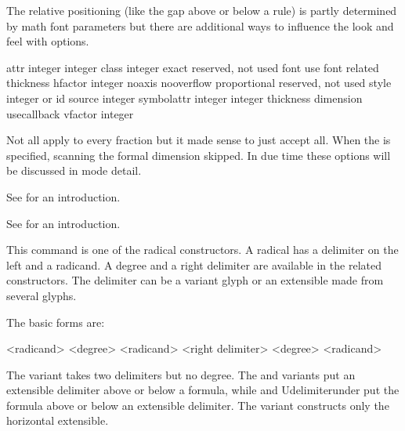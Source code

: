 The relative positioning (like the gap above or below a rule) is partly
determined by math font parameters but there are additional ways to influence the
look and feel with options.

\starttabulate[|Tl|l|l|]
\NC attr         \NC integer integer \NC \NC \NR
\NC class        \NC integer         \NC \NC \NR
\NC exact        \NC                 \NC reserved, not used \NC \NR
\NC font         \NC                 \NC use font related thickness \NC \NR
\NC hfactor      \NC integer         \NC \NC \NR
\NC noaxis       \NC                 \NC \NC \NR
\NC nooverflow   \NC                 \NC \NC \NR
\NC proportional \NC                 \NC reserved, not used \NC \NR
\NC style        \NC integer or id   \NC \NC \NR
\NC source       \NC integer         \NC \NC \NR
\NC symbolattr   \NC integer integer \NC \NC \NR
\NC thickness    \NC dimension       \NC \NC \NR
\NC usecallback  \NC                 \NC \NC \NR
\NC vfactor      \NC integer         \NC \NC \NR
\stoptabulate

Not all apply to every fraction but it made sense to just accept all. When the
 is specified, scanning the formal dimension skipped. In due
time these options will be discussed in mode detail.

\stopnewprimitive

\startnewprimitive[title={\prm {Uoverdelimiter}}]

See  for an introduction.

\stopnewprimitive

\startnewprimitive[title={\prm {Uoverwithdelims}}]

See  for an introduction.

\stopnewprimitive

\startnewprimitive[title={\prm {Uradical}}]

This command is one of the radical constructors. A radical has a delimiter on
the left and a radicand. A degree and a right delimiter are available in the
related constructors. The delimiter can be a variant glyph or an extensible
made from several glyphs.

The basic forms are:

\starttabulate[|l|l|]
    \NC \type {\Uradical}  {<radicand>} \NC \NR
    \NC \type {\Uroot}     {<degree>} {<radicand>} \NC \NR
    \NC \type {\Urooted}   <right delimiter> {<degree>} {<radicand>} \NC \NR
\stoptabulate

The  variant takes two delimiters but no degree. The
 and  variants put an extensible
delimiter above or below a formula, while  and \prm
{Udelimiterunder} put the formula above or below an extensible delimiter. The
 variant constructs only the horizontal extensible.

